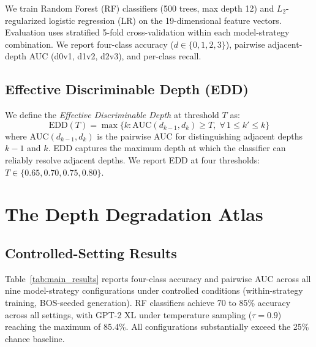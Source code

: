 \documentclass[11pt,a4paper]{article}
\begin{document}
We train Random Forest (RF) classifiers (500 trees, max depth 12) and $L_2$-regularized logistic regression (LR) on the 19-dimensional feature vectors.
Evaluation uses stratified 5-fold cross-validation within each model-strategy combination.
We report four-class accuracy ($d \in \{0,1,2,3\}$), pairwise adjacent-depth AUC (d0v1, d1v2, d2v3), and per-class recall.

\subsection{Effective Discriminable Depth (EDD)}

We define the \emph{Effective Discriminable Depth} at threshold $T$ as:
\begin{equation}
\text{EDD}(T) = \max\{k : \text{AUC}(d_{k-1}, d_k) \geq T, \; \forall\, 1 \leq k' \leq k\}
\label{eq:edd}
\end{equation}
where $\text{AUC}(d_{k-1}, d_k)$ is the pairwise AUC for distinguishing adjacent depths $k{-}1$ and $k$.
EDD captures the maximum depth at which the classifier can reliably resolve adjacent depths.
We report EDD at four thresholds: $T \in \{0.65, 0.70, 0.75, 0.80\}$.

\section{The Depth Degradation Atlas}
\label{sec:atlas}

\subsection{Controlled-Setting Results}

Table~\ref{tab:main_results} reports four-class accuracy and pairwise AUC across all nine model-strategy configurations under controlled conditions (within-strategy training, BOS-seeded generation).
RF classifiers achieve 70 to 85\% accuracy across all settings, with GPT-2 XL under temperature sampling ($\tau{=}0.9$) reaching the maximum of 85.4\%.
All configurations substantially exceed the 25\% chance baseline.
\end{document}
